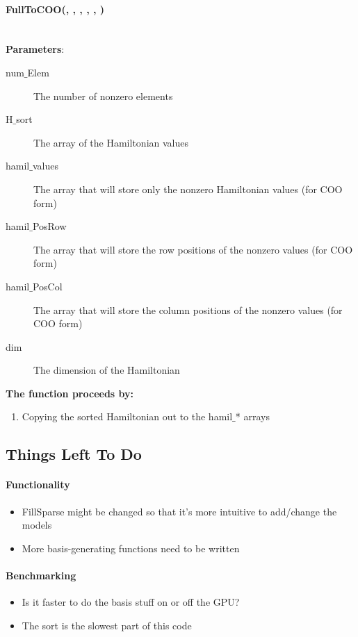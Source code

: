 \documentclass{article}
\begin{document}
{\paragraph{\cudaglobal \void FullToCOO(\int , \hamstruct, \cuDoubleComplex , \ptrint , \ptrint, \long) \\ \\}
\noindent\textbf{Parameters}:
\begin{description}
\item[\int num$\_$Elem] The number of nonzero elements
\item[\hamstruct H$\_$sort] The array of the Hamiltonian values
\item[\cuDoubleComplex hamil$\_$values] The array that will store only the nonzero Hamiltonian values (for COO form)
\item[\ptrint hamil$\_$PosRow] The array that will store the row positions of the nonzero values (for COO form)
\item[\ptrint hamil$\_$PosCol] The array that will store the column positions of the nonzero values (for COO form)
\item[\long dim] The dimension of the Hamiltonian

\end{description}

\noindent\textbf{The function proceeds by:}
\begin{enumerate}
\item{Copying the sorted Hamiltonian out to the hamil$\_$* arrays}
\end{enumerate}

\subsection{Things Left To Do}
\paragraph{Functionality}
\begin{itemize}
\item{FillSparse might be changed so that it's more intuitive to add/change the models}
\item{More basis-generating functions need to be written}
\end{itemize}
\paragraph{Benchmarking}
\begin{itemize}
\item{Is it faster to do the basis stuff on or off the GPU?}
\item{The sort is the slowest part of this code}
\end{itemize}

}
\end{document}
